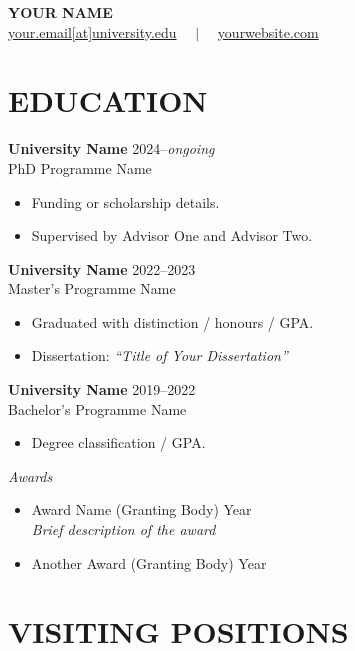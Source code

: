 \documentclass[a4paper,10pt]{article}
\newcommand{\education}[3]{%
  \textbf{#1} \hfill #2 \\
  \hspace*{1em}#3%
}
\begin{document}

\begin{center}
  {\Large \textbf{YOUR NAME}} \\[4pt]
  \href{mailto:your.email@university.edu}{your.email[at]university.edu}
  $\quad|\quad$
  \href{https://yourwebsite.com}{yourwebsite.com}
\end{center}

\section*{EDUCATION}

\education{University Name}{2024--\emph{ongoing}}{PhD Programme Name}
\begin{itemize}
  \item Funding or scholarship details.
  \item Supervised by Advisor One and Advisor Two.
\end{itemize}
\vspace{1em}

\education{University Name}{2022--2023}{Master's Programme Name}
\begin{itemize}
  \item Graduated with distinction / honours / GPA.
  \item Dissertation: \emph{``Title of Your Dissertation''}
\end{itemize}
\vspace{1em}

\education{University Name}{2019--2022}{Bachelor's Programme Name}
\begin{itemize}
  \item Degree classification / GPA.
\end{itemize}
\vspace{1em}

\textit{Awards}
\begin{itemize}[leftmargin=1em]
  \item Award Name (Granting Body) \hfill Year \\
    \textit{Brief description of the award}
  \item Another Award (Granting Body) \hfill Year
\end{itemize}

\section*{VISITING POSITIONS}
\end{document}
